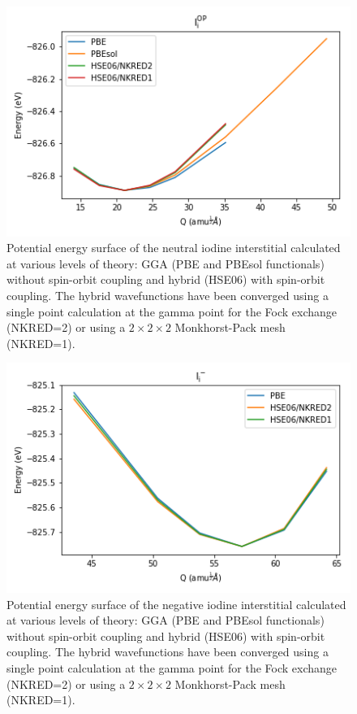 

\begin{figure}[h!] 
\centering
  \includegraphics[width=0.7\columnwidth]{figures/ch6/neutral_comparison.png}
  \caption[Potential energy surface of $\mathrm{I}_\mathrm{i}^0$ calculated at various levels of theory]{Potential energy surface of the neutral iodine interstitial calculated at various levels of theory: GGA (PBE and PBEsol functionals) without spin-orbit coupling and hybrid (HSE06) with spin-orbit coupling. The hybrid wavefunctions have been converged using a single point calculation at the gamma point for the Fock exchange (NKRED=2) or using a $2\!\times\!2\!\times\!2$ Monkhorst-Pack mesh (NKRED=1).}
\end{figure}

\begin{figure}[h!]  
\centering
  \includegraphics[width=0.7\columnwidth]{figures/ch6/negative_comparison.png}
  \caption[Potential energy surface of $\mathrm{I}_\mathrm{i}^-$ calculated at various levels of theory]{Potential energy surface of the negative iodine interstitial calculated at various levels of theory: GGA (PBE and PBEsol functionals) without spin-orbit coupling and hybrid (HSE06) with spin-orbit coupling. The hybrid wavefunctions have been converged using a single point calculation at the gamma point for the Fock exchange (NKRED=2) or using a $2\!\times\!2\!\times\!2$ Monkhorst-Pack mesh (NKRED=1).}
\end{figure}

